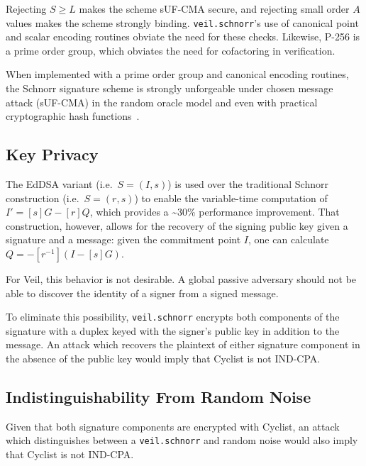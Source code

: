 Rejecting $S \geq L$ makes the scheme sUF-CMA secure, and rejecting small order $A$ values makes the scheme strongly
binding.
\texttt{veil.schnorr}'s use of canonical point and scalar encoding routines obviate the need for these checks.
Likewise, P-256 is a prime order group, which obviates the need for cofactoring in verification.

When implemented with a prime order group and canonical encoding routines, the Schnorr signature scheme is strongly
unforgeable under chosen message attack (sUF-CMA) in the random oracle model and even with practical cryptographic hash
functions~\cite{pointcheval2000,neven2009}.

\subsection{Key Privacy}\label{subsec:veil.schnorr-key-privacy}

The EdDSA variant (i.e.\ $S=(I,s)$) is used over the traditional Schnorr construction (i.e.\ $S=(r,s)$) to enable the
variable-time computation of $I'=[s]G - [r]Q$, which provides a \textasciitilde30\% performance improvement.
That construction, however, allows for the recovery of the signing public key given a signature and a message: given the
commitment point $I$, one can calculate $Q=-[r^{-1}](I - [s]G)$.

For Veil, this behavior is not desirable.
A global passive adversary should not be able to discover the identity of a signer from a signed message.

To eliminate this possibility, \texttt{veil.schnorr} encrypts both components of the signature with a duplex keyed with
the signer's public key in addition to the message.
An attack which recovers the plaintext of either signature component in the absence of the public key would imply that
Cyclist is not IND-CPA\@.

\subsection{Indistinguishability From Random Noise}\label{subsec:veil.schnorr-indistinguishability}

Given that both signature components are encrypted with Cyclist, an attack which distinguishes between a
\texttt{veil.schnorr} and random noise would also imply that Cyclist is not IND-CPA\@.
